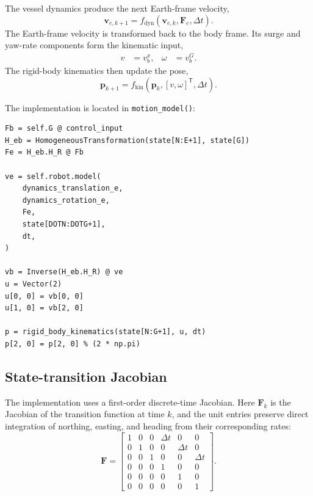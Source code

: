 \documentclass[11pt,a4paper]{article}
\begin{document}
The vessel dynamics produce the next Earth-frame velocity,
\begin{equation}
\bm{v}_{e,k+1}=f_{\mathrm{dyn}}
\left(\bm{v}_{e,k},\bm{F}_e,\Delta t\right).
\end{equation}
The Earth-frame velocity is transformed back to the body frame. Its surge and yaw-rate components form the kinematic input,
\begin{equation}
\begin{aligned}
v &= v_b^x, &
\omega &= v_b^G.
\end{aligned}
\end{equation}
The rigid-body kinematics then update the pose,
\begin{equation}
\bm{p}_{k+1}=f_{\mathrm{kin}}
\left(\bm{p}_k,[v,\omega]^{\mathsf T},\Delta t\right).
\end{equation}

The implementation is located in \texttt{motion\_model()}:

\begin{lstlisting}
Fb = self.G @ control_input
H_eb = HomogeneousTransformation(state[N:E+1], state[G])
Fe = H_eb.H_R @ Fb

ve = self.robot.model(
    dynamics_translation_e,
    dynamics_rotation_e,
    Fe,
    state[DOTN:DOTG+1],
    dt,
)

vb = Inverse(H_eb.H_R) @ ve
u = Vector(2)
u[0, 0] = vb[0, 0]
u[1, 0] = vb[2, 0]

p = rigid_body_kinematics(state[N:G+1], u, dt)
p[2, 0] = p[2, 0] % (2 * np.pi)
\end{lstlisting}

\subsection{State-transition Jacobian}

The implementation uses a first-order discrete-time Jacobian. Here
$\bm{F}_k$ is the Jacobian of the transition function at time $k$, and the
unit entries preserve direct integration of northing, easting, and heading
from their corresponding rates:
\begin{equation}
\bm{F}=
\begin{bmatrix}
1 & 0 & 0 & \Delta t & 0 & 0 \\
0 & 1 & 0 & 0 & \Delta t & 0 \\
0 & 0 & 1 & 0 & 0 & \Delta t \\
0 & 0 & 0 & 1 & 0 & 0 \\
0 & 0 & 0 & 0 & 1 & 0 \\
0 & 0 & 0 & 0 & 0 & 1
\end{bmatrix}.
\end{equation}
\end{document}

